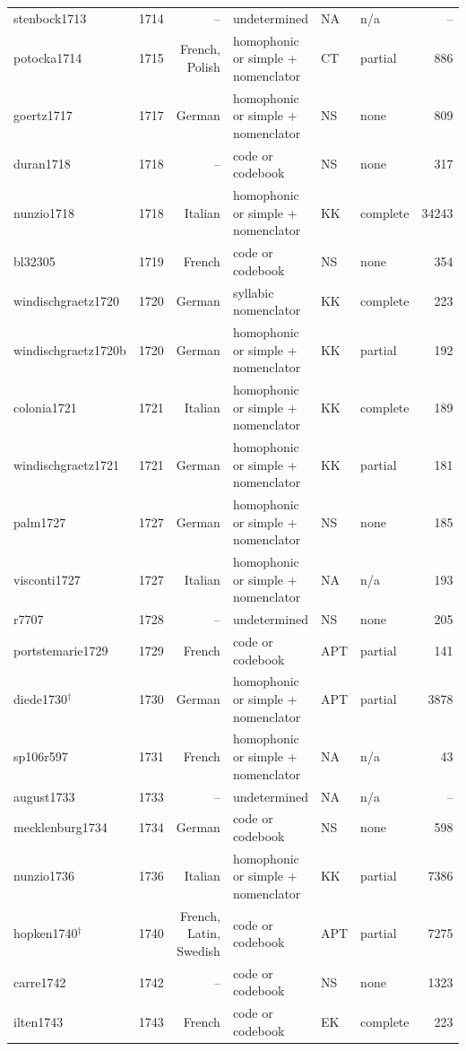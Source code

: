 {\begin{longtable}{@{}llrlllr@{}}
stenbock1713 & 1714 & -- & undetermined & NA & n/a & -- \\
potocka1714 & 1715 & French, Polish & homophonic or simple + nomenclator & CT & partial & 886 \\
goertz1717 & 1717 & German & homophonic or simple + nomenclator & NS & none & 809 \\
duran1718 & 1718 & -- & code or codebook & NS & none & 317 \\
nunzio1718 & 1718 & Italian & homophonic or simple + nomenclator & KK & complete & 34243 \\
bl32305 & 1719 & French & code or codebook & NS & none & 354 \\
windischgraetz1720 & 1720 & German & syllabic nomenclator & KK & complete & 223 \\
windischgraetz1720b & 1720 & German & homophonic or simple + nomenclator & KK & partial & 192 \\
colonia1721 & 1721 & Italian & homophonic or simple + nomenclator & KK & complete & 189 \\
windischgraetz1721 & 1721 & German & homophonic or simple + nomenclator & KK & partial & 181 \\
palm1727 & 1727 & German & homophonic or simple + nomenclator & NS & none & 185 \\
visconti1727 & 1727 & Italian & homophonic or simple + nomenclator & NA & n/a & 193 \\
r7707 & 1728 & -- & undetermined & NS & none & 205 \\
portstemarie1729 & 1729 & French & code or codebook & APT & partial & 141 \\
diede1730$^\dagger$ & 1730 & German & homophonic or simple + nomenclator & APT & partial & 3878 \\
sp106r597 & 1731 & French & homophonic or simple + nomenclator & NA & n/a & 43 \\
august1733 & 1733 & -- & undetermined & NA & n/a & -- \\
mecklenburg1734 & 1734 & German & code or codebook & NS & none & 598 \\
nunzio1736 & 1736 & Italian & homophonic or simple + nomenclator & KK & partial & 7386 \\
hopken1740$^\dagger$ & 1740 & French, Latin, Swedish & code or codebook & APT & partial & 7275 \\
carre1742 & 1742 & -- & code or codebook & NS & none & 1323 \\
ilten1743 & 1743 & French & code or codebook & EK & complete & 223 \\

\end{longtable}}
